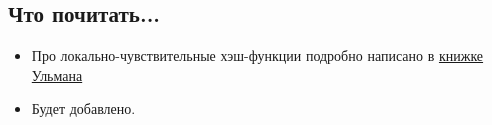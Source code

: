 \subsection{Что почитать...}

\begin{itemize}

\item Про локально-чувствительные хэш-функции подробно написано в \href{http://infolab.stanford.edu/~ullman/mmds/book.pdf}{книжке Ульмана}
\item Будет добавлено.
  
\end{itemize}


\clearpage
